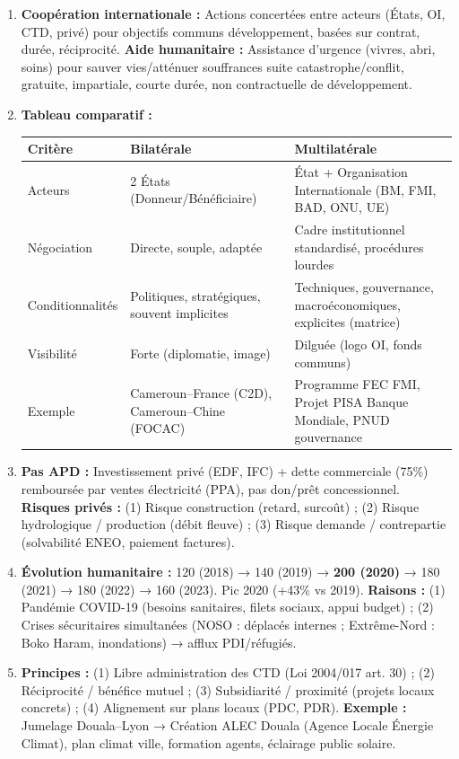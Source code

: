 \documentclass[11pt]{article}
\begin{document}
\begin{corrige}
\begin{enumerate}
    \item \textbf{Coopération internationale :} Actions concertées entre acteurs (États, OI, CTD, privé) pour objectifs communs développement, basées sur contrat, durée, réciprocité. \textbf{Aide humanitaire :} Assistance d'urgence (vivres, abri, soins) pour sauver vies/atténuer souffrances suite catastrophe/conflit, gratuite, impartiale, courte durée, non contractuelle de développement.
    \item \textbf{Tableau comparatif :}
    \begin{center}
    \begin{tabularx}{\linewidth}{|l|X|X|}\hline
    \rowcolor{popblueL}
    \textbf{Critère} & \textbf{Bilatérale} & \textbf{Multilatérale} \\ \hline
    Acteurs & 2 États (Donneur/Bénéficiaire) & État + Organisation Internationale (BM, FMI, BAD, ONU, UE) \\ \hline
    Négociation & Directe, souple, adaptée & Cadre institutionnel standardisé, procédures lourdes \\ \hline
    Conditionnalités & Politiques, stratégiques, souvent implicites & Techniques, gouvernance, macroéconomiques, explicites (matrice) \\ \hline
    Visibilité & Forte (diplomatie, image) & Dilguée (logo OI, fonds communs) \\ \hline
    Exemple & Cameroun–France (C2D), Cameroun–Chine (FOCAC) & Programme FEC FMI, Projet PISA Banque Mondiale, PNUD gouvernance \\ \hline
    \end{tabularx}
    \end{center}
    \item \textbf{Pas APD :} Investissement privé (EDF, IFC) + dette commerciale (75\%) remboursée par ventes électricité (PPA), pas don/prêt concessionnel. \textbf{Risques privés :} (1) Risque construction (retard, surcoût) ; (2) Risque hydrologique / production (débit fleuve) ; (3) Risque demande / contrepartie (solvabilité ENEO, paiement factures).
    \item \textbf{Évolution humanitaire :} 120 (2018) → 140 (2019) → \textbf{200 (2020)} → 180 (2021) → 180 (2022) → 160 (2023). Pic 2020 (+43\% vs 2019). \textbf{Raisons :} (1) Pandémie COVID-19 (besoins sanitaires, filets sociaux, appui budget) ; (2) Crises sécuritaires simultanées (NOSO : déplacés internes ; Extrême-Nord : Boko Haram, inondations) → afflux PDI/réfugiés.
    \item \textbf{Principes :} (1) Libre administration des CTD (Loi 2004/017 art. 30) ; (2) Réciprocité / bénéfice mutuel ; (3) Subsidiarité / proximité (projets locaux concrets) ; (4) Alignement sur plans locaux (PDC, PDR). \textbf{Exemple :} Jumelage Douala–Lyon → Création ALEC Douala (Agence Locale Énergie Climat), plan climat ville, formation agents, éclairage public solaire.
\end{enumerate}
\end{corrige}
\end{document}
